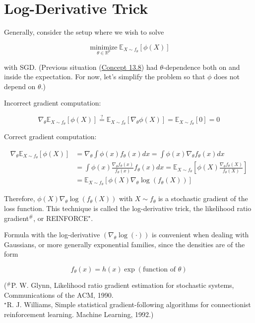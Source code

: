 \section{Log-Derivative Trick}

\begin{definition}
    Generally, consider the setup where we wish to solve

    $$
    \underset{\theta \in \mathbb{R}^{p}}{\operatorname{minimize}} \mathbb{E}_{X \sim f_{\theta}}[\phi(X)]
    $$

    with SGD.
    (Previous situation (\hyperref[concept:13.8]{Concept 13.8}) had $\theta$-dependence both on and inside the expectation. For now, let's simplify the problem so that $\phi$ does not depend on $\theta$.)

    Incorrect gradient computation:

    $$
    \nabla_{\theta} \mathbb{E}_{X \sim f_{\theta}}[\phi(X)] \stackrel{?}{=} \mathbb{E}_{X \sim f_{\theta}}\left[\nabla_{\theta} \phi(X)\right]=\mathbb{E}_{X \sim f_{\theta}}[0]=0
    $$

    Correct gradient computation:

    $$
    \begin{aligned}
    \nabla_{\theta} \mathbb{E}_{X \sim f_{\theta}}[\phi(X)] & =\nabla_{\theta} \int \phi(x) f_{\theta}(x) d x=\int \phi(x) \nabla_{\theta} f_{\theta}(x) d x \\
    & =\int \phi(x) \frac{\nabla_{\theta} f_{\theta}(x)}{f_{\theta}(x)} f_{\theta}(x) d x=\mathbb{E}_{X \sim f_{\theta}}\left[\phi(X) \frac{\nabla_{\theta} f_{\theta}(X)}{f_{\theta}(X)}\right] \\
    & =\mathbb{E}_{X \sim f_{\theta}}\left[\phi(X) \nabla_{\theta} \log \left(f_{\theta}(X)\right)\right]
    \end{aligned}
    $$

    Therefore, $\phi(X) \nabla_{\theta} \log \left(f_{\theta}(X)\right)$ with $X \sim f_{\theta}$ is a stochastic gradient of the loss function. This technique is called the log-derivative trick, the likelihood ratio gradient$^{\#}$, or REINFORCE$^{\star}$.

    Formula with the log-derivative $\left(\nabla_{\theta} \log (\cdot)\right)$ is convenient when dealing with Gaussians, or more generally exponential families, since the densities are of the form

    $$
    f_{\theta}(x)=h(x) \exp (\text {function of } \theta)
    $$

    (${}^{\#}$P. W. Glynn, Likelihood ratio gradient estimation for stochastic systems, Communications of the ACM, 1990.\\
    ${}^{\star}$R. J. Williams, Simple statistical gradient-following algorithms for connectionist reinforcement learning. Machine Learning, 1992.)
\end{definition}

